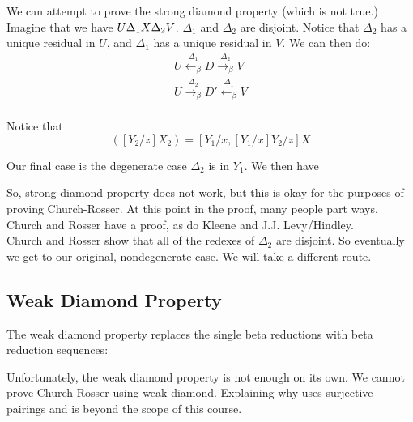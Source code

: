 We can attempt to prove the strong diamond property (which is not true.) Imagine that we have $U \over{\Delta_1}{\leftarrow_\beta} X \over{\Delta_2}{\rightarrow_\beta} V$. $\Delta_1$ and $\Delta_2$ are disjoint. Notice that $\Delta_2$ has a unique residual in $U$, and $\Delta_1$ has a unique residual in $V$. We can then do:
\begin{eqnarray*}
  U \stackrel{\Delta_1}{\leftarrow_\beta} D \stackrel{\Delta_2}{\rightarrow_\beta} V\\
  U \stackrel{\Delta_2}{\rightarrow_\beta} D' \stackrel{\Delta_1}{\leftarrow_\beta} V\\
\end{eqnarray*}

Notice that
\begin{equation*}
  [Y_1/x]([Y_2/z]X_2) = [Y_1/x, [Y_1/x]Y_2/z]X
\end{equation*}

Our final case is the degenerate case $\Delta_2$ is in $Y_1$. We then have
\begin{center}
\end{center}
So, strong diamond property does not work, but this is okay for the purposes of proving Church-Rosser. At this point in the proof, many people part ways. Church and Rosser have a proof, as do Kleene and J.J. Levy/Hindley.\\

Church and Rosser show that all of the redexes of $\Delta_2$ are disjoint. So eventually we get to our original, nondegenerate case. We will take a different route.\\

\subsection{Weak Diamond Property}
The weak diamond property replaces the single beta reductions with beta reduction sequences:
\begin{center}
\end{center}
Unfortunately, the weak diamond property is not enough on its own. We cannot prove Church-Rosser using weak-diamond. Explaining why uses surjective pairings and is beyond the scope of this course.\\

